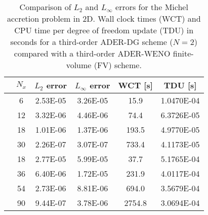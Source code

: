 \begin{table}[t]
	\centering
	\begin{tabular}{ c c  cccc  }
		\hline
		& $N_x$ &  $L_2$ error & ${L_\infty}$ error & WCT [s] & TDU [s]  \\ 
		\hline
		\multirow{4}{*}{\rotatebox{90}{{DG $\mathcal{O}3$}}}
		&  6     &    2.53E-05  & 3.26E-05 	    &  15.9     &  1.0470E-04  \\ %
		& 12     &    3.32E-06 	&  4.46E-06	 	& 74.4     &  6.3726E-05  	\\ %
		& 18     &    1.01E-06 	&  1.37E-06	 	& 193.5     & 4.9770E-05 	\\ %
		& 30     &    2.26E-07 	&  3.07E-07	 	& 733.4     & 4.1173E-05 	\\ %
		\cline{2-5}
		\hline
		\multirow{4}{*}{\rotatebox{90}{{FV $\mathcal{O}3$}}}
		& 18    &    2.77E-05 	&  5.99E-05 	 &   37.7     &    5.1765E-04  \\  %
		& 36    &   6.40E-06 	&  1.72E-05 	 	&  231.9     &   4.0117E-04 	\\ %
		& 54    &   2.73E-06 	&  8.81E-06 	 	&  694.0     &   3.5679E-04 	\\ %
		& 90    &   9.44E-07 	&  3.78E-06 	 	&  2754.8     &  3.0694E-04  	\\  %
		\cline{2-5}
		\hline	
	\end{tabular}
	\caption[
	  Convergence norms for 2D Michel accretion
	]{  Comparison of $L_2$ and $L_\infty$
          errors for the Michel accretion problem in 2D. Wall clock times
          (WCT) and CPU time per degree of freedom update (TDU) in
          seconds for a third-order ADER-DG scheme ($N=2$) compared with
          a third-order ADER-WENO finite-volume (FV) scheme.} \label{tab:CTimes}
\end{table}

